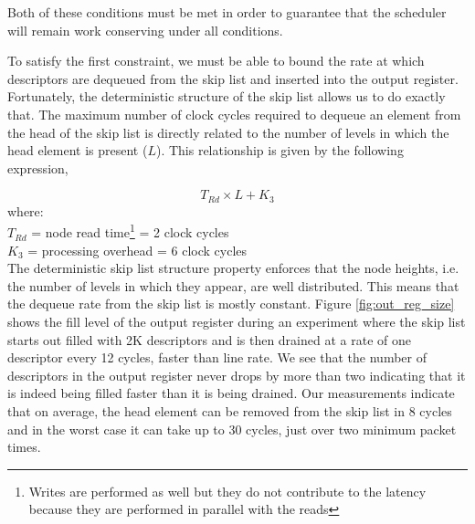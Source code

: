 Both of these conditions must be met in order to guarantee that the scheduler will remain work conserving under all conditions. 

To satisfy the first constraint, we must be able to bound the rate at which descriptors are dequeued from the skip list and inserted into the output register. Fortunately, the deterministic structure of the skip list allows us to do exactly that. The maximum number of clock cycles required to dequeue an element from the head of the skip list is directly related to the number of levels in which the head element is present ($L$). This relationship is given by the following expression,

\begin{equation}\label{worst-case-remove_eqn}
T_{Rd} \times L + K_{3}
\end{equation}
where:\\
\indent $T_{Rd}$ = node read time\footnote{Writes are performed as well but they do not contribute to the latency because they are performed in parallel with the reads} = 2 clock cycles\\
\indent $K_{3}$ = processing overhead = 6 clock cycles\\

The deterministic skip list structure property enforces that the node heights, i.e. the number of levels in which they appear, are well distributed. This means that the dequeue rate from the skip list is mostly constant. Figure \ref{fig:out_reg_size} shows the fill level of the output register during an experiment where the skip list starts out filled with 2K descriptors and is then drained at a rate of one descriptor every 12 cycles, faster than line rate. We see that the number of descriptors in the output register never drops by more than two indicating that it is indeed being filled faster than it is being drained. Our measurements indicate that on average, the head element can be removed from the skip list in 8 cycles and in the worst case it can take up to 30 cycles, just over two minimum packet times.

